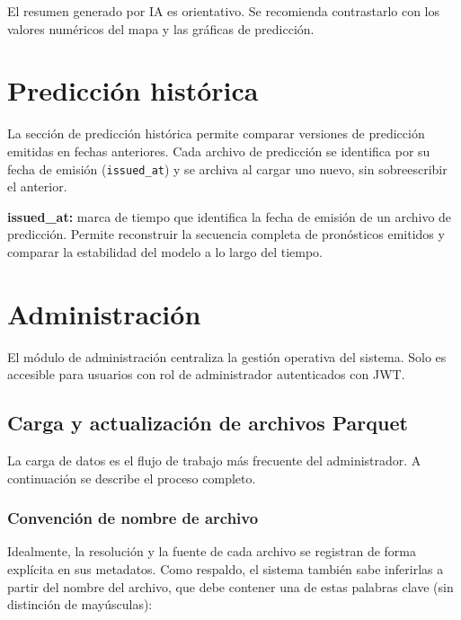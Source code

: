 \begin{remark}
El resumen generado por IA es orientativo. Se recomienda contrastarlo con los valores numéricos del mapa y las gráficas de predicción.
\end{remark}

\section{Predicción histórica}
\label{sec:prediccion_historica}

La sección de predicción histórica permite comparar versiones de predicción emitidas en fechas anteriores. Cada archivo de predicción se identifica por su fecha de emisión (\texttt{issued\_at}) y se archiva al cargar uno nuevo, sin sobreescribir el anterior.

\begin{definition}
\textbf{issued\_at:} marca de tiempo que identifica la fecha de emisión de un archivo de predicción. Permite reconstruir la secuencia completa de pronósticos emitidos y comparar la estabilidad del modelo a lo largo del tiempo.
\end{definition}

\section{Administración}
\label{sec:administracion_func}

El módulo de administración centraliza la gestión operativa del sistema. Solo es accesible para usuarios con rol de administrador autenticados con JWT.

\subsection{Carga y actualización de archivos Parquet}

La carga de datos es el flujo de trabajo más frecuente del administrador. A continuación se describe el proceso completo.

\subsubsection{Convención de nombre de archivo}

Idealmente, la resolución y la fuente de cada archivo se registran de forma explícita en sus metadatos. Como respaldo, el sistema también sabe inferirlas a partir del nombre del archivo, que debe contener una de estas palabras clave (sin distinción de mayúsculas):

